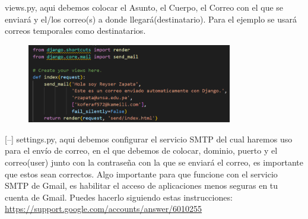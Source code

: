 \documentclass{article}
\begin{document}
\begin{enumerate}
\begin{description}
\begin{description}
[--] views.py, aqui debemos colocar el Asunto, el Cuerpo, el Correo con el que se enviará y el/los correo(s) a donde llegará(destinatario). Para el ejemplo se usará correos temporales como destinatarios.
\begin{figure}[H]
		\centering
		\includegraphics[width=0.8\textwidth,keepaspectratio]{img/Ejercicio4/1.png}
	\end{figure}
[--] settings.py, aqui debemos configurar el servicio SMTP del cual haremos uso para el envío de correo, en el que debemos de colocar, dominio, puerto y el correo(user) junto con la contraseña con la que se enviará el correo, es importante que estos sean correctos. Algo importante para que funcione con el servicio SMTP de Gmail, es habilitar el acceso de aplicaciones menos seguras en tu cuenta de Gmail. Puedes hacerlo siguiendo estas instrucciones: \url{https://support.google.com/accounts/answer/6010255}


\end{description}
\end{description}
\end{enumerate}
\end{document}
